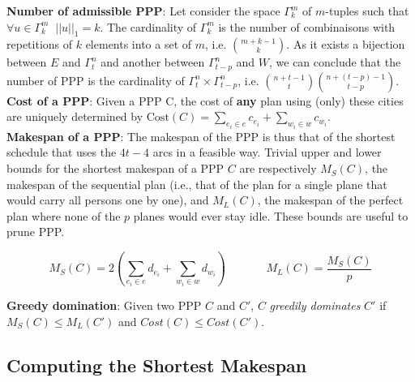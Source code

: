 \documentclass{llncs}
\begin{document}
\noindent
{\bf Number of admissible PPP}: Let consider the space $\Gamma^{m}_{k}$ of $m$-tuples such that $\forall u \in \Gamma^{m}_{k} \;\; ||u||_1 = k$. The cardinality of $\Gamma^{m}_{k}$ is the number of combinaisons with repetitions of $k$ elements into a set of $m$, i.e. ${m+k-1 \choose k}$. As it exists a bijection between $E$ and $\Gamma^{n}_{t}$ and another between $\Gamma^{n}_{t-p}$ and $W$, we can conclude that the number of PPP is the cardinality of $\Gamma^{n}_{t} \times \Gamma^{n}_{t-p}$, i.e. ${n+t-1 \choose t}{n+(t-p)-1 \choose t-p}$.\\

\noindent
{\bf Cost of a PPP}: Given a PPP C, the cost of {\bf any} plan using (only) these cities are uniquely determined by $ \text{Cost}(C) = \underset{{e_i \in e}}{\sum} c_{e_i} + \underset{{w_i \in w}}{\sum} c_{w_i}$.\\

\noindent
{\bf Makespan of a PPP}: The makespan of the PPP is thus that of the shortest schedule that uses the $4t-4$ arcs in a feasible way. Trivial upper and lower bounds for the shortest makespan of a PPP $C$ are respectively $M_S(C)$, the makespan of the sequential plan (i.e., that of the plan for a single plane that would carry all persons one by one), and $M_L(C)$, the makespan of the perfect plan where none of the $p$ planes would ever stay idle. These bounds are useful to prune PPP.

$$M_S(C) = 2 (\underset{{e_i \in e}}{\sum} d_{e_i} + \underset{{w_i \in w}}{\sum} d_{w_i}) ~~~~~~~~~~~~~~~~ M_L(C) = \frac{M_S(C)}{p}$$

\noindent
{\bf Greedy domination}: Given two PPP $C$ and $C'$, $C$ {\it greedily dominates} $C'$ if $M_S(C) \leq M_L(C')$ and $Cost(C) \leq Cost(C')$.

\subsection{Computing the Shortest Makespan}
\end{document}
